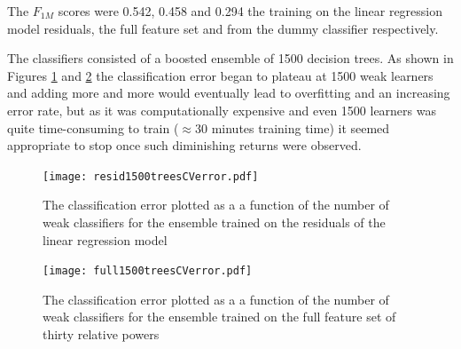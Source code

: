 The $F_{1M}$ scores were 0.542, 0.458 and 0.294 the training on the linear regression model residuals, the full feature set and from the dummy classifier respectively. 

The classifiers consisted of a boosted ensemble of 1500 decision trees. As shown in Figures \ref{fig:resid1500treesCVerror} and \ref{fig:full1500treesCVerror} the classification error began to plateau at 1500 weak learners and adding more and more would eventually lead to overfitting and an increasing error rate, but as it was computationally expensive and even 1500 learners was quite time-consuming to train ($\approx30$ minutes training time) it seemed appropriate to stop once such diminishing returns were observed.



\begin{figure}[h!]
  \centering
    \texttt{[image: resid1500treesCVerror.pdf]}
    \caption{The classification error plotted as a a function of the number of weak classifiers for the ensemble trained on the residuals of the linear regression model}
    \label{fig:resid1500treesCVerror}
\end{figure}



\begin{figure}[h!]
  \centering
    \texttt{[image: full1500treesCVerror.pdf]}
    \caption{The classification error plotted as a a function of the number of weak classifiers for the ensemble trained on the full feature set of thirty relative powers}
    \label{fig:full1500treesCVerror}
\end{figure}



